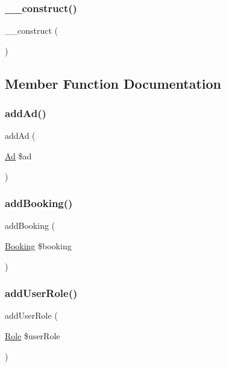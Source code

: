 \subsubsection{\texorpdfstring{\_\_construct()}{\_\_construct()}}
{\footnotesize\ttfamily \+\_\+\+\_\+construct (\begin{DoxyParamCaption}{ }\end{DoxyParamCaption})}



\subsection{Member Function Documentation}
\mbox{\label{class_app_1_1_entity_1_1_user_a7d241864594cb22027cc541da209ef62}} 
\subsubsection{\texorpdfstring{addAd()}{addAd()}}
{\footnotesize\ttfamily add\+Ad (\begin{DoxyParamCaption}\item[{\mbox{\hyperlink{class_app_1_1_entity_1_1_ad}{Ad}}}]{\$ad }\end{DoxyParamCaption})}

\mbox{\label{class_app_1_1_entity_1_1_user_a843c4ecdcf427fcc51745d213a56ee66}} 
\subsubsection{\texorpdfstring{addBooking()}{addBooking()}}
{\footnotesize\ttfamily add\+Booking (\begin{DoxyParamCaption}\item[{\mbox{\hyperlink{class_app_1_1_entity_1_1_booking}{Booking}}}]{\$booking }\end{DoxyParamCaption})}

\mbox{\label{class_app_1_1_entity_1_1_user_a5dfec06ae4ff6f4acd120a4c25de760a}} 
\subsubsection{\texorpdfstring{addUserRole()}{addUserRole()}}
{\footnotesize\ttfamily add\+User\+Role (\begin{DoxyParamCaption}\item[{\mbox{\hyperlink{class_app_1_1_entity_1_1_role}{Role}}}]{\$user\+Role }\end{DoxyParamCaption})}

